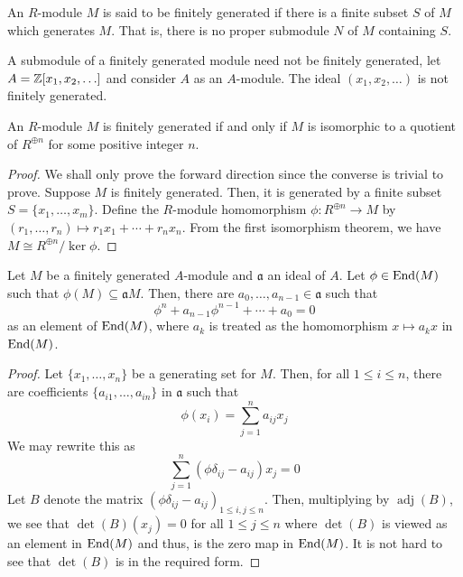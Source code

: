 \begin{definition}
    An $R$-module $M$ is said to be finitely generated if there is a finite subset $S$ of $M$ which generates $M$. That is, there is no proper submodule $N$ of $M$ containing $S$.
\end{definition}

A submodule of a finitely generated module need not be finitely generated, let $A = \mathbb{Z}[x_1,x_2,\ldots]$ and consider $A$ as an $A$-module. The ideal $(x_1,x_2,\ldots)$ is not finitely generated.

\begin{proposition}
    An $R$-module $M$ is finitely generated if and only if $M$ is isomorphic to a quotient of $R^{\oplus n}$ for some positive integer $n$.
\end{proposition}
\begin{proof}
    We shall only prove the forward direction since the converse is trivial to prove. Suppose $M$ is finitely generated. Then, it is generated by a finite subset $S = \{x_1,\ldots,x_m\}$. Define the $R$-module homomorphism $\phi:R^{\oplus n}\to M$ by $(r_1,\ldots,r_n)\mapsto r_1x_1 + \cdots + r_nx_n$. From the first isomorphism theorem, we have $M\cong R^{\oplus n}/\ker\phi$.
\end{proof}

\begin{proposition}
    Let $M$ be a finitely generated $A$-module and $\mathfrak a$ an ideal of $A$. Let $\phi\in\operatorname{End}(M)$ such that $\phi(M)\subseteq\mathfrak aM$. Then, there are $a_0,\ldots,a_{n - 1}\in\mathfrak a$ such that 
    \begin{equation*}
        \phi^n + a_{n - 1}\phi^{n - 1} + \cdots + a_0 = 0
    \end{equation*}
    as an element of $\operatorname{End}(M)$, where $a_k$ is treated as the homomorphism $x\mapsto a_kx$ in $\operatorname{End}(M)$.
\end{proposition}
\begin{proof}
    Let $\{x_1,\ldots,x_n\}$ be a generating set for $M$. Then, for all $1\le i\le n$, there are coefficients $\{a_{i1},\ldots,a_{in}\}$ in $\mathfrak a$ such that 
    \begin{equation*}
        \phi(x_i) = \sum_{j = 1}^n a_{ij}x_j
    \end{equation*}
    We may rewrite this as 
    \begin{equation*}
        \sum_{j = 1}^n(\phi\delta_{ij} - a_{ij})x_j = 0
    \end{equation*}
    Let $B$ denote the matrix $(\phi\delta_{ij} - a_{ij})_{1\le i,j\le n}$. Then, multiplying by $\operatorname{adj}(B)$, we see that $\det(B)(x_j) = 0$ for all $1\le j\le n$ where $\det(B)$ is viewed as an element in $\operatorname{End}(M)$ and thus, is the zero map in $\operatorname{End}(M)$. It is not hard to see that $\det(B)$ is in the required form.
\end{proof}

